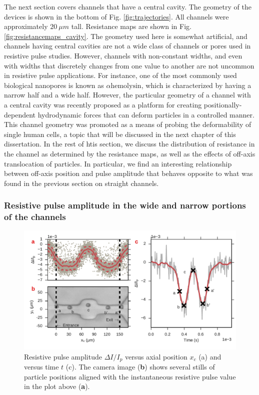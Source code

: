 		
			The next section covers channels that have a central cavity. The geometry of the devices is shown in the bottom of Fig. \ref{fig:trajectories}. All channels were approximately $\SI{20}{\mu m}$ tall. Resistance maps are shown in Fig. \ref{fig:resistancemaps_cavity}. The geometry used here is somewhat artificial, and channels having central cavities are not a wide class of channels or pores used in resistive pulse studies. However, channels with non-constant widths, and even with widths that discretely changes from one value to another are not uncommon in resistive pulse applications. For instance, one of the most commonly used biological nanopores is known as $\alpha\mathrm{hemolysin}$, which is characterized by having a narrow half and a wide half. However, the particular geometry of a channel with a central cavity was recently proposed as a platform for creating positionally-dependent hydrodynamic forces that can deform particles in a controlled manner. This channel geometry was promoted as a means of probing the deformability of single human cells, a topic that will be discussed in the next chapter of this dissertation. In the rest of htis section, we discuss the distribution of resistance in the channel as determined by the resistance maps, as well as the effects of off-axis translocation of particles. In particular, we find an interesting relationship between off-axis position and pulse amplitude that behaves opposite to what was found in the previous section on straight channels.
			
			
			\subsubsection{Resistive pulse amplitude in the wide and narrow portions of the channels}
			
			\begin{figure}
				\includegraphics[width=\textwidth]{channelentrancecavity.pdf}
				\caption{Resistive pulse amplitude $\Delta I/I_{p}$ versus axial position $x_{c}$ (a) and versus time $t$ (c). The camera image (\textbf{b}) shows several stills of particle positions aligned with the instantaneous resistive pulse value in the plot above (\textbf{a}).}
				\label{fig:channelentrancecavity}
			\end{figure}

